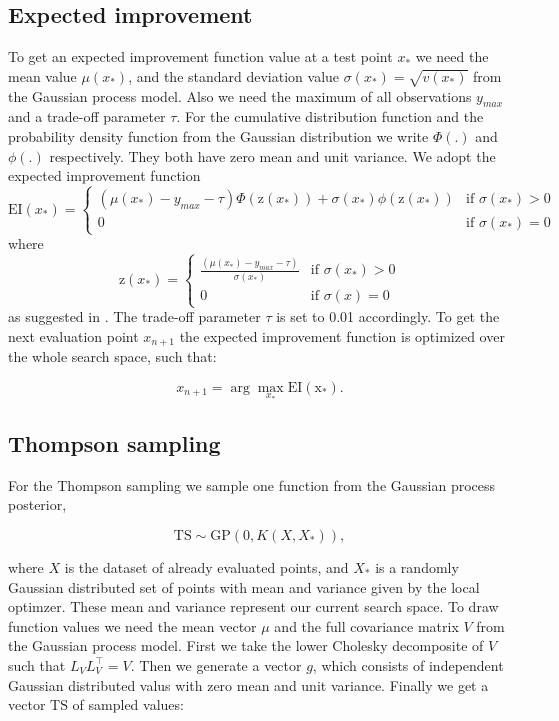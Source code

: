 \subsection{Expected improvement}
To get an expected improvement function value at a test point $x_*$ we need the mean value $\mu(x_*)$, and the standard deviation value $\sigma(x_*) = \sqrt{v(x_*)}$ from the Gaussian process model. Also we need the maximum of all observations $y_{max}$ and a trade-off parameter $\tau$. For the cumulative distribution function and the probability density function from the Gaussian distribution we write $\Phi(.)$ and $\phi(.)$ respectively. They both have zero mean and unit variance.
We adopt the expected improvement function
\[
    \mathrm{EI}(x_*)=
\begin{cases}
    (\mu(x_*) - y_{max} - \tau)\Phi(\mathrm{z}(x_*))+\sigma(x_*)\phi(\mathrm{z}(x_*))& \text{if } \sigma(x_*)> 0\\
    0 & \text{if } \sigma(x_*)= 0
\end{cases}
\]
where
\[
    \mathrm{z}(x_*)=
\begin{cases}
    \frac{(\mu(x_*) -y_{max} - \tau)}{\sigma(x_*)} & \text{if } \sigma(x_*)> 0\\
    0 & \text{if } \sigma(x)= 0
\end{cases}
\]
as suggested in \cite{brochu2010tutorial}. The trade-off parameter $\tau$ is set to 0.01 accordingly. To get the next evaluation point $x_{n+1}$ the expected improvement function is optimized over the whole search space, such that:

$$x_{n+1} = \arg \max_{x_*} \mathrm{EI(x_*)}.$$

\subsection{Thompson sampling}
For the Thompson sampling we sample one function from the Gaussian process posterior,

$$\mathrm{TS}\sim \mathrm{GP}(0,K(X,X_*)),$$

where $X$ is the dataset of already evaluated points, and $X_*$ is a randomly Gaussian distributed set of points with mean and variance given by the local optimzer. These mean and variance represent our current search space.
To draw function values we need the mean vector $\mu$ and the full covariance matrix $V$ from the Gaussian process model. First we take the lower Cholesky decomposite of $V$ such that $L_V L_V^\top = V$. Then we generate a vector $g$, which consists of independent Gaussian distributed valus with zero mean and unit variance. Finally we get a vector $\mathrm{TS}$ of sampled values:

